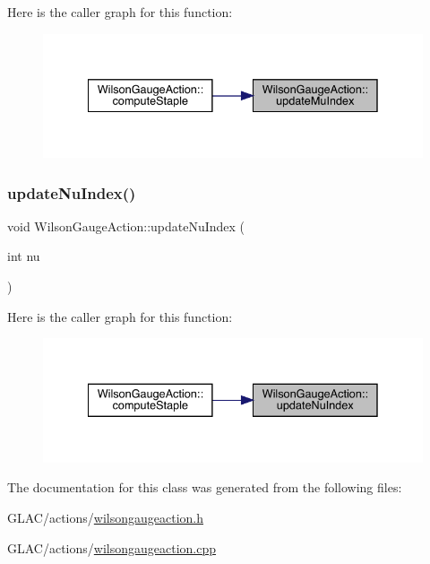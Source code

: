 Here is the caller graph for this function\+:
\nopagebreak
\begin{figure}[H]
\begin{center}
\leavevmode
\includegraphics[width=335pt]{class_wilson_gauge_action_ab7ed4ab8e475f5a188cd19ce720a5eb9_icgraph}
\end{center}
\end{figure}
\mbox{\label{class_wilson_gauge_action_a010b3b8870476dfec4c48a01b6d6fc1d}} 
\subsubsection{\texorpdfstring{updateNuIndex()}{updateNuIndex()}}
{\footnotesize\ttfamily void Wilson\+Gauge\+Action\+::update\+Nu\+Index (\begin{DoxyParamCaption}\item[{int}]{nu }\end{DoxyParamCaption})\hspace{0.3cm}{\ttfamily [inline]}}

Here is the caller graph for this function\+:
\nopagebreak
\begin{figure}[H]
\begin{center}
\leavevmode
\includegraphics[width=335pt]{class_wilson_gauge_action_a010b3b8870476dfec4c48a01b6d6fc1d_icgraph}
\end{center}
\end{figure}


The documentation for this class was generated from the following files\+:\begin{DoxyCompactItemize}
\item 
G\+L\+A\+C/actions/\mbox{\hyperlink{wilsongaugeaction_8h}{wilsongaugeaction.\+h}}\item 
G\+L\+A\+C/actions/\mbox{\hyperlink{wilsongaugeaction_8cpp}{wilsongaugeaction.\+cpp}}\end{DoxyCompactItemize}
